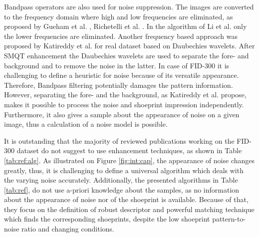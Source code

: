 \documentclass[draft,final]{vutinfth} %
\begin{document}
\par
Bandpass operators are also used for noise suppression.
The images are converted to the frequency domain where high and low frequencies are eliminated, as proposed by Gueham et al. \cite{gueham2007automatic},  Richetelli et al. \cite{richetelli2017classification}.
In the algorithm of Li et al. \cite{li2014retrieval} only the lower frequencies are eliminated.
Another frequency based approach was proposed by Katireddy et al. \cite{katireddy2017novel} for real dataset based on Daubechies wavelets.
After SMQT enhancement the Daubechies wavelets are used to separate the fore- and background and to remove the noise in the latter.
In case of FID-300 it is challenging to define a heuristic for noise because of its versatile appearance.
Therefore, Bandpass filtering potentially damages the pattern information.
However, separating the fore- and the background, as Katireddy et al. \cite{katireddy2017novel} propose, makes it possible to process the noise and shoeprint impression independently.
Furthermore, it also gives a sample about the appearance of noise on a given image, thus a calculation of a noise model is possible.

\par
It is outstanding that the majority of reviewed publications working on the FID-300 dataset do not suggest to use enhancement techniques, as shown in Table \ref{tab:ref:alg}.
As illustrated on Figure \ref{fig:int:cap}, the appearance of noise changes greatly, thus, it is challenging to define a universal algorithm which deals with the  varying noise accurately.
Additionally, the presented algorithms in Table \ref{tab:ref}, do not use a-priori knowledge about the samples, as no information about the appearance of noise nor of the shoeprint is available.
Because of that, they focus on the definition of robust descriptor and powerful matching technique which finds the corresponding shoeprints, despite the low shoeprint pattern-to-noise ratio and changing conditions.
\end{document}
